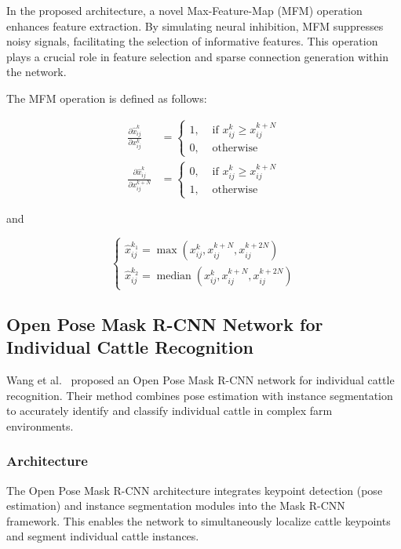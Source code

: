 \documentclass[journal, biblatex]{IEEEtran}
\begin{document}
In the proposed architecture, a novel Max-Feature-Map (MFM) operation enhances feature extraction. By simulating neural inhibition, MFM suppresses noisy signals, facilitating the selection of informative features. This operation plays a crucial role in feature selection and sparse connection generation within the network.

The MFM operation is defined as follows:

\[
\begin{aligned}
\frac{\partial \hat{x}_{i j}^k}{\partial x_{i j}^k} & = \begin{cases}1, & \text { if } x_{i j}^k \geq x_{i j}^{k+N} \\
0, & \text { otherwise }\end{cases} \\
\frac{\partial \hat{x}_{i j}^k}{\partial x_{i j}^{k+N}} & = \begin{cases}0, & \text { if } x_{i j}^k \geq x_{i j}^{k+N} \\
1, & \text { otherwise }\end{cases}
\end{aligned}
\]

and 

\[
\left\{\begin{array}{l}
\hat{x}_{i j}^{k_1}=\max \left(x_{i j}^k, x_{i j}^{k+N}, x_{i j}^{k+2 N}\right) \\
\hat{x}_{i j}^{k_2}=\operatorname{median}\left(x_{i j}^k, x_{i j}^{k+N}, x_{i j}^{k+2 N}\right)
\end{array}\right.
\]

\subsection[Open Pose Mask R-CNN Network for Individual Cattle Recognition]{Open Pose Mask R-CNN Network for Individual Cattle Recognition}

Wang et al.~\cite{wang2023} proposed an Open Pose Mask R-CNN network for individual cattle recognition. Their method combines pose estimation with instance segmentation to accurately identify and classify individual cattle in complex farm environments.

\subsubsection{Architecture}
The Open Pose Mask R-CNN architecture integrates keypoint detection (pose estimation) and instance segmentation modules into the Mask R-CNN framework. This enables the network to simultaneously localize cattle keypoints and segment individual cattle instances.
\end{document}
